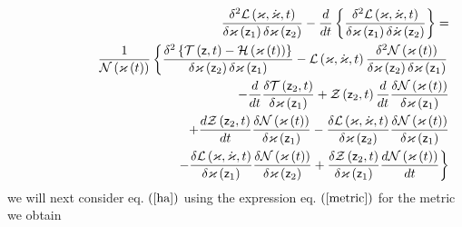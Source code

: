 \begin{eqnarray}
&&\frac{\delta ^{2}{\cal L}\left( {\cal \varkappa },{\cal \dot{\varkappa}}%
,t\right) }{\delta \varkappa \left( {\sf z}_{1}\right) \delta \varkappa
\left( {\sf z}_{2}\right) }-\frac{d}{dt}\left\{ \frac{\delta ^{2}{\cal L}%
\left( \varkappa ,\dot{\varkappa},t\right) }{\delta \varkappa \left( {\sf z}%
_{1}\right) \delta \dot{\varkappa}\left( {\sf z}_{2}\right) }\right\} = 
\nonumber \\
&&\frac{1}{{\cal N}\left( {\cal \varkappa }\left( t\right) \right) }\left\{ 
\frac{\delta ^{2}\left\{ {\cal T}\left( {\sf z},t\right) -{\cal H}\left( 
{\cal \varkappa }\left( t\right) \right) \right\} }{\delta \varkappa \left( 
{\sf z}_{2}\right) \delta {\cal \varkappa }\left( {\sf z}_{1}\right) }-{\cal %
L}\left( {\cal \varkappa },{\cal \dot{\varkappa}},t\right) \frac{\delta ^{2}%
{\cal N}\left( {\cal \varkappa }\left( t\right) \right) }{\delta \varkappa
\left( {\sf z}_{2}\right) \delta {\cal \varkappa }\left( {\sf z}_{1}\right) }%
\right.  \nonumber \\
&&\qquad \qquad \qquad \qquad \qquad \qquad \qquad \qquad -\frac{d}{dt}\frac{%
\delta {\cal T}\left( {\sf z}_{2},t\right) }{\delta \varkappa \left( {\sf z}%
_{1}\right) }+{\cal Z}\left( {\sf z}_{2},t\right) \frac{d}{dt}\frac{\delta 
{\cal N}\left( {\cal \varkappa }\left( t\right) \right) }{\delta \varkappa
\left( {\sf z}_{1}\right) }  \nonumber \\
&&+\frac{d{\cal Z}\left( {\sf z}_{2},t\right) }{dt}\frac{\delta {\cal N}%
\left( {\cal \varkappa }\left( t\right) \right) }{\delta \varkappa \left( 
{\sf z}_{1}\right) }-\frac{\delta {\cal L}\left( {\cal \varkappa },{\cal 
\dot{\varkappa}},t\right) }{\delta \varkappa \left( {\sf z}_{2}\right) }%
\frac{\delta {\cal N}\left( {\cal \varkappa }\left( t\right) \right) }{%
\delta {\cal \varkappa }\left( {\sf z}_{1}\right) }  \nonumber \\
&&\qquad \qquad \qquad \qquad \qquad \left. -\frac{\delta {\cal L}\left( 
{\cal \varkappa },{\cal \dot{\varkappa}},t\right) }{\delta \varkappa \left( 
{\sf z}_{1}\right) }\frac{\delta {\cal N}\left( {\cal \varkappa }\left(
t\right) \right) }{\delta {\cal \varkappa }\left( {\sf z}_{2}\right) }+\frac{%
\delta {\cal Z}\left( {\sf z}_{2},t\right) }{\delta \varkappa \left( {\sf z}%
_{1}\right) }\frac{d{\cal N}\left( {\cal \varkappa }\left( t\right) \right) 
}{dt}\right\}
\end{eqnarray}%
we will next consider eq. $\left( \ref{ha}\right) $ using the expression eq. 
$\left( \ref{metric}\right) $ for the metric we obtain 
